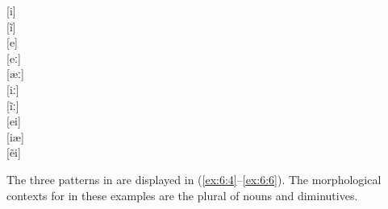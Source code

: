 \ea%
\label{ex:6:3}
\ea\label{ex:6:3a}
  \relax [u]{\textasciitilde}[i]\\
  \relax [ũ]{\textasciitilde}[ĩ]\\         
  \relax [o]{\textasciitilde}[e]\\       
  \relax [oː]{\textasciitilde}[eː]\\
  \relax [ɑː]{\textasciitilde}[æː]\\

\ex\label{ex:6:3b} \relax [yː]{\textasciitilde}[iː]\\
    \relax [ỹː]{\textasciitilde}[ĩː]\\
    

\ex\label{ex:6:3c} \relax [øi]{\textasciitilde}[ei]\\
    \relax [yo]{\textasciitilde}[iæ]\\
    \relax [\~ɑi]{\textasciitilde}[ẽi]\\
\z 
\z 

The three patterns in  are displayed in (\ref{ex:6:4}--\ref{ex:6:6}). The morphological contexts for  in these examples are the plural of nouns and diminutives.

